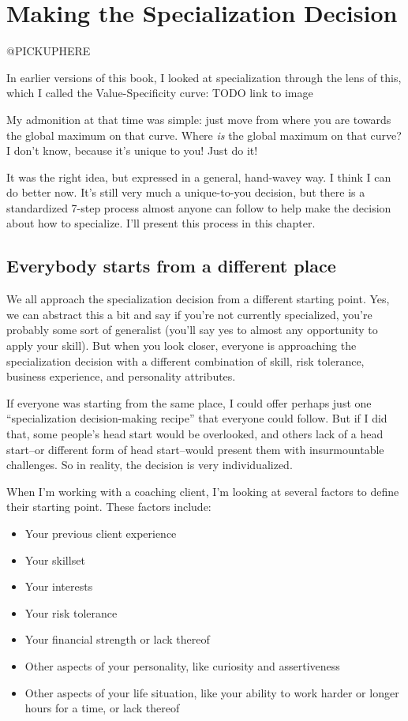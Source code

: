 \chapter{Making the Specialization Decision}

@PICKUPHERE

In earlier versions of this book, I looked at specialization through the lens of this, which I called the Value-Specificity curve: TODO link to image

My admonition at that time was simple: just move from where you are towards the global maximum on that curve. Where \emph{is} the global maximum on that curve? I don't know, because it's unique to you! Just do it!

It was the right idea, but expressed in a general, hand-wavey way. I think I can do better now. It's still very much a unique-to-you decision, but there is a standardized 7-step process almost anyone can follow to help make the decision about how to specialize. I'll present this process in this chapter.

\section{Everybody starts from a different place}

We all approach the specialization decision from a different starting point. Yes, we can abstract this a bit and say if you're not currently specialized, you're probably some sort of generalist (you'll say yes to almost any opportunity to apply your skill). But when you look closer, everyone is approaching the specialization decision with a different combination of skill, risk tolerance, business experience, and personality attributes.

If everyone was starting from the same place, I could offer perhaps just one ``specialization decision-making recipe'' that everyone could follow. But if I did that, some people's head start would be overlooked, and others lack of a head start--or different form of head start--would present them with insurmountable challenges. So in reality, the decision is very individualized.

When I'm working with a coaching client, I'm looking at several factors to define their starting point. These factors include:

\begin{itemize}
\item Your previous client experience
\item Your skillset
\item Your interests
\item Your risk tolerance
\item Your financial strength or lack thereof
\item Other aspects of your personality, like curiosity and assertiveness
\item Other aspects of your life situation, like your ability to work harder or longer hours for a time, or lack thereof
\end{itemize}

